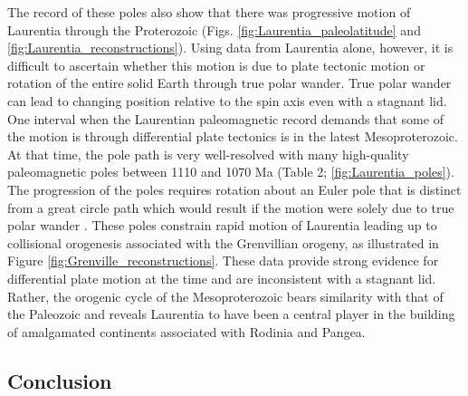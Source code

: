 \documentclass[11pt,letterpaper]{article}
\begin{document}
The record of these poles also show that there was progressive motion of Laurentia through the Proterozoic (Figs. \ref{fig:Laurentia_paleolatitude} and \ref{fig:Laurentia_reconstructions}). Using data from Laurentia alone, however, it is difficult to ascertain whether this motion is due to plate tectonic motion or rotation of the entire solid Earth through true polar wander. True polar wander can lead to changing position relative to the spin axis even with a stagnant lid. One interval when the Laurentian paleomagnetic record demands that some of the motion is through differential plate tectonics is in the latest Mesoproterozoic. At that time, the pole path is very well-resolved with many high-quality paleomagnetic poles between 1110 and 1070 Ma (Table 2; \ref{fig:Laurentia_poles}). The progression of the poles requires rotation about an Euler pole that is distinct from a great circle path which would result if the motion were solely due to true polar wander \citep{Swanson-Hysell2019a}. These poles constrain rapid motion of Laurentia leading up to collisional orogenesis associated with the Grenvillian orogeny, as illustrated in Figure \ref{fig:Grenville_reconstructions}. These data provide strong evidence for differential plate motion at the time and are inconsistent with a stagnant lid. Rather, the orogenic cycle of the Mesoproterozoic bears similarity with that of the Paleozoic and reveals Laurentia to have been a central player in the building of amalgamated continents associated with Rodinia and Pangea.

\subsection{Conclusion}
\end{document}
